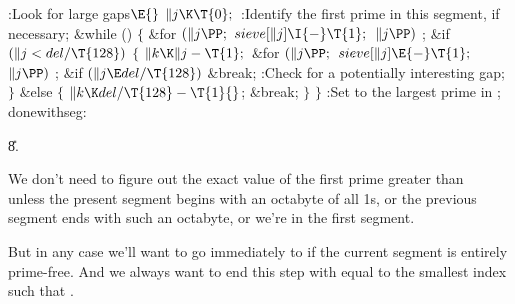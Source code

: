 \Y\B\4:Look for large gaps\X${}\E{}$\6
$\|j\K\T{0};{}$\6
:Identify the first prime in this segment, if necessary\X;\6
\&{while} ()\5
${}\{{}$\1\6
\&{for} ${}(\|j\PP;{}$ ${}\\{sieve}[\|j]\I{-}\T{1};{}$ ${}\|j\PP){}$\1\5
;\2\6
\&{if} ${}(\|j<\\{del}/\T{128}){}$\5
${}\{{}$\1\6
${}\|k\K\|j-\T{1};{}$\6
\&{for} ${}(\|j\PP;{}$ ${}\\{sieve}[\|j]\E{-}\T{1};{}$ ${}\|j\PP){}$\1\5
;\2\6
\&{if} ${}(\|j\E\\{del}/\T{128}){}$\1\5
\&{break};\2\6
:Check for a potentially interesting gap\X;\6
\4${}\}{}$\5
\2\&{else}\5
${}\{{}$\1\6
${}\|k\K\\{del}/\T{128}-\T{1}{}$;\5
\&{break};\6
\4${}\}{}$\2\6
\4${}\}{}$\2\6
:Set  to the largest prime in \X;\6
\4\\{donewithseg}:\par
\U8.\fi

We don't need to figure out the exact value of the
first prime
greater than~ unless the present segment begins with an octabyte
of all 1s, or the previous segment ends with such an octabyte,
or we're in the first segment.

But in any case we'll want to go immediately to  if
the current segment is entirely prime-free. And we always want to
end this step with  equal to the smallest index such that .

